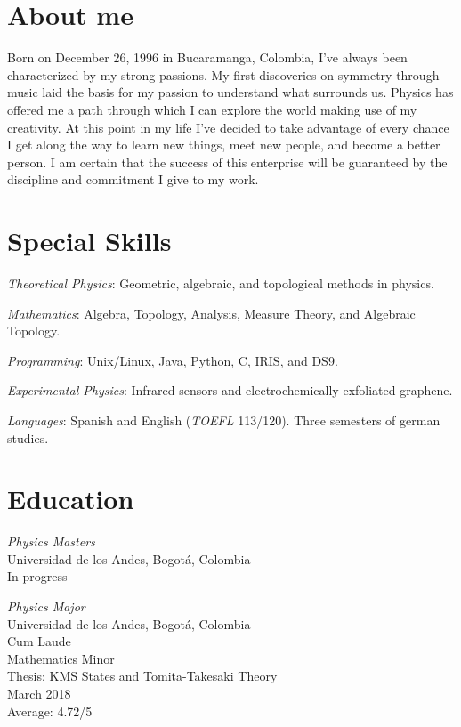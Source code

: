 \documentclass[line,margin]{res}
\begin{document}
\address{ivanmbur@gmail.com\\ Cr. 19 63 27, Bogotá, Colombia\\ (+57) 316 782 1110}

\begin{resume}

\section{About me}

Born on December 26, 1996 in Bucaramanga, Colombia, I've always been characterized by my strong passions. My first discoveries on symmetry through music laid the basis for my passion to understand what surrounds us. Physics has offered me a path through which I can explore the world making use of my creativity. At this point in my life I've decided to take advantage of every chance I get along the way to learn new things, meet new people, and become a better person. I am certain that the success of this enterprise will be guaranteed by the discipline and commitment I give to my work. 

\section{Special Skills}

{\sl Theoretical Physics}: Geometric, algebraic, and topological methods in physics.

{\sl Mathematics}: Algebra, Topology, Analysis, Measure Theory, and Algebraic Topology.

{\sl Programming}: Unix/Linux, Java, Python, C, IRIS, and DS9.

{\sl Experimental Physics}: Infrared sensors and electrochemically exfoliated graphene. 

{\sl Languages}: Spanish and English ({\sl TOEFL} 113/120). Three semesters of german studies.

\section{Education}

{\sl Physics Masters\\}
Universidad de los Andes, Bogotá, Colombia \\
In progress

{\sl Physics Major\\}
Universidad de los Andes, Bogotá, Colombia \\
Cum Laude \\
Mathematics Minor \\
Thesis: KMS States and Tomita-Takesaki Theory \\
March 2018 \\
Average: 4.72/5


\end{resume}
\end{document}

